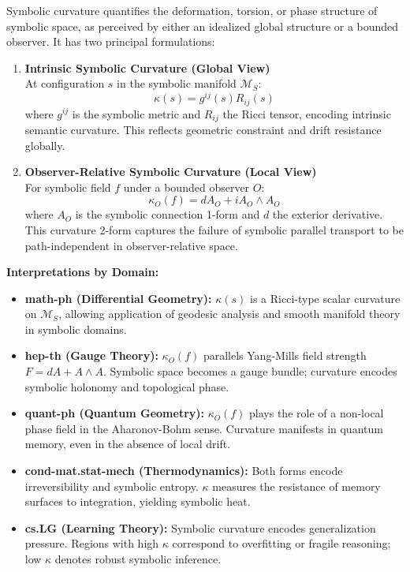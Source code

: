 \begin{definition}
\label{def:bk4_symbolic_curvature}
Symbolic curvature quantifies the deformation, torsion, or phase structure of symbolic space, as perceived by either an idealized global structure or a bounded observer. It has two principal formulations:

\begin{enumerate}
    \item \textbf{Intrinsic Symbolic Curvature (Global View)} \\
    At configuration $s$ in the symbolic manifold $\mathcal{M}_S$:
    \[
    \kappa(s) = g^{ij}(s) R_{ij}(s)
    \]
    where $g^{ij}$ is the symbolic metric and $R_{ij}$ the Ricci tensor, encoding intrinsic semantic curvature. This reflects geometric constraint and drift resistance globally.

    \item \textbf{Observer-Relative Symbolic Curvature (Local View)} \\
    For symbolic field $f$ under a bounded observer $O$:
    \[
    \kappa_O(f) = dA_O + i A_O \wedge A_O
    \]
    where $A_O$ is the symbolic connection 1-form and $d$ the exterior derivative. This curvature 2-form captures the failure of symbolic parallel transport to be path-independent in observer-relative space.
\end{enumerate}

\vspace{1em}
\textbf{Interpretations by Domain:}

\begin{itemize}
    \item \textbf{math-ph (Differential Geometry):} $\kappa(s)$ is a Ricci-type scalar curvature on $\mathcal{M}_S$, allowing application of geodesic analysis and smooth manifold theory in symbolic domains.

    \item \textbf{hep-th (Gauge Theory):} $\kappa_O(f)$ parallels Yang-Mills field strength $F = dA + A \wedge A$. Symbolic space becomes a gauge bundle; curvature encodes symbolic holonomy and topological phase.

    \item \textbf{quant-ph (Quantum Geometry):} $\kappa_O(f)$ plays the role of a non-local phase field in the Aharonov-Bohm sense. Curvature manifests in quantum memory, even in the absence of local drift.

    \item \textbf{cond-mat.stat-mech (Thermodynamics):} Both forms encode irreversibility and symbolic entropy. $\kappa$ measures the resistance of memory surfaces to integration, yielding symbolic heat.

    \item \textbf{cs.LG (Learning Theory):} Symbolic curvature encodes generalization pressure. Regions with high $\kappa$ correspond to overfitting or fragile reasoning; low $\kappa$ denotes robust symbolic inference.
\end{itemize}
\end{definition}

